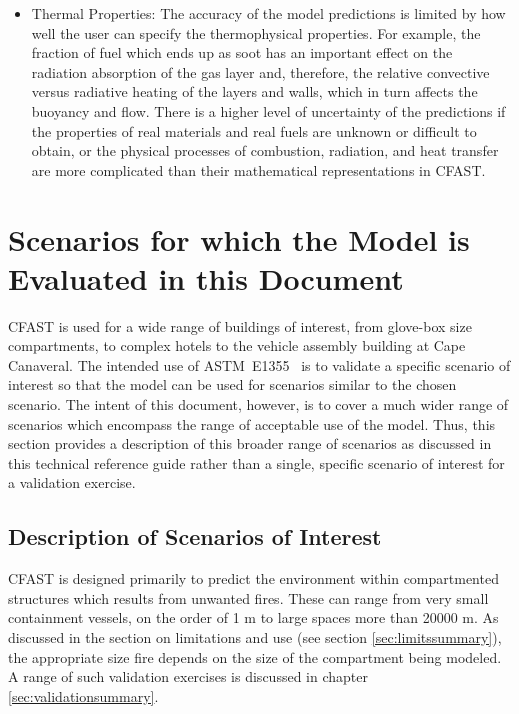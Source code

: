 \begin{itemize}
\item Thermal Properties:  The accuracy of the model predictions is limited by how well the user can specify the thermophysical properties.  For example, the fraction of fuel which ends up as soot has an important effect on the radiation absorption of the gas layer and, therefore, the relative convective versus radiative heating of the layers and walls, which in turn affects the buoyancy and flow.  There is a higher level of uncertainty of the predictions if the properties of real materials and real fuels are unknown or difficult to obtain, or the physical processes of combustion, radiation, and heat transfer are more complicated than their mathematical representations in CFAST.
\end{itemize}


\section{Scenarios for which the Model is Evaluated in this Document}

CFAST is used for a wide range of buildings of interest, from glove-box size compartments, to complex hotels to the vehicle assembly building at Cape Canaveral. The intended use of ASTM~E1355~\cite{ASTM:E1355} is to validate a specific scenario of interest so that the model can be used for scenarios similar to the chosen scenario. The intent of this document, however, is to cover a much wider range of scenarios which encompass the range of acceptable use of the model. Thus, this section provides a description of this broader range of scenarios as discussed in this technical reference guide rather than a single, specific scenario of interest for a validation exercise.

\subsection{Description of Scenarios of Interest}

CFAST is designed primarily to predict the environment within compartmented structures which results from unwanted fires. These can range from very small containment vessels, on the order of 1 m to large spaces more than 20000 m. As discussed in the section on limitations and use (see section \ref{sec:limitssummary}), the appropriate size fire depends on the size of the compartment being modeled. A range of such validation exercises is discussed in chapter \ref{sec:validationsummary}.

